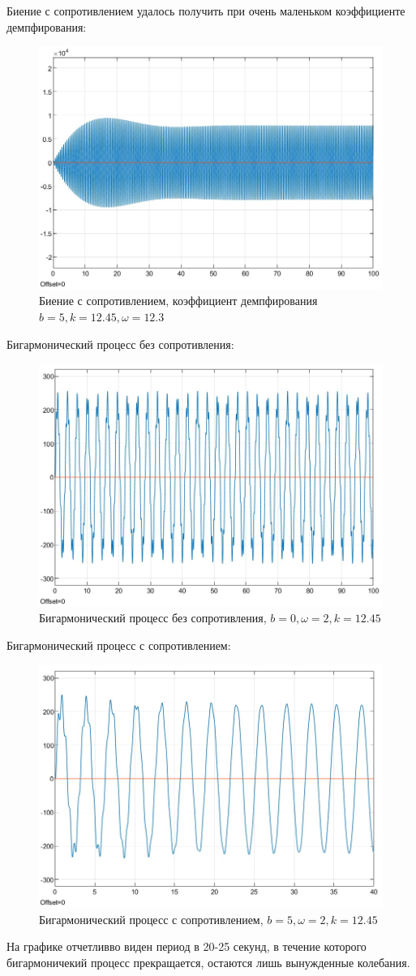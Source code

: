 \documentclass{article}
\begin{document}
	Биение с сопротивлением удалось получить при очень маленьком коэффициенте демпфирования:
	\begin{figure}[H]
		\centering
		\includegraphics[width=0.7\linewidth]{graph11}
		\caption{Биение с сопротивлением, коэффициент демпфирования $b=5, k = 12.45, \omega = 12.3$}

	\end{figure}
	
	Бигармонический процесс без сопротивления:
	\begin{figure}[H]
		\centering
		\includegraphics[width=0.7\linewidth]{graph9}
		\caption{Бигармонический процесс без сопротивления, $b = 0, \omega = 2, k = 12.45$}
	\end{figure}
	Бигармонический процесс с сопротивлением:
	\begin{figure}[H]
		\centering
		\includegraphics[width=0.7\linewidth]{graph12}
		\caption{Бигармонический процесс с сопротивлением, $b = 5, \omega = 2, k = 12.45$}
	\end{figure}
	На графике отчетливво виден период в 20-25 секунд, в течение которого бигармоничекий процесс прекращается, остаются лишь вынужденные колебания.
	
\end{document}
